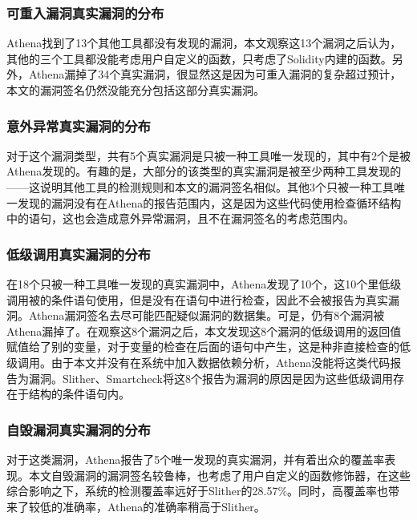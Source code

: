 \subsubsection{可重入漏洞真实漏洞的分布}

Athena找到了13个其他工具都没有发现的漏洞，本文观察这13个漏洞之后认为，其他的三个工具都没能考虑用户自定义的函数，只考虑了Solidity内建的函数。另外，Athena漏掉了34个真实漏洞，很显然这是因为可重入漏洞的复杂超过预计，本文的漏洞签名仍然没能充分包括这部分真实漏洞。

\subsubsection{意外异常真实漏洞的分布}

对于这个漏洞类型，共有5个真实漏洞是只被一种工具唯一发现的，其中有2个是被Athena发现的。有趣的是，大部分的该类型的真实漏洞是被至少两种工具发现的——这说明其他工具的检测规则和本文的漏洞签名相似。其他3个只被一种工具唯一发现的漏洞没有在Athena的报告范围内，这是因为这些代码使用检查循环结构中的语句，这也会造成意外异常漏洞，且不在漏洞签名的考虑范围内。

\subsubsection{低级调用真实漏洞的分布}

在18个只被一种工具唯一发现的真实漏洞中，Athena发现了10个，这10个里低级调用被的条件语句使用，但是没有在语句中进行检查，因此不会被报告为真实漏洞。Athena漏洞签名去尽可能匹配疑似漏洞的数据集。可是，仍有8个漏洞被Athena漏掉了。在观察这8个漏洞之后，本文发现这8个漏洞的低级调用的返回值赋值给了别的变量，对于变量的检查在后面的语句中产生，这是种非直接检查的低级调用。由于本文并没有在系统中加入数据依赖分析，Athena没能将这类代码报告为漏洞。Slither、Smartcheck将这8个报告为漏洞的原因是因为这些低级调用存在于结构的条件语句内。

\subsubsection{自毁漏洞真实漏洞的分布}

对于这类漏洞，Athena报告了5个唯一发现的真实漏洞，并有着出众的覆盖率表现。本文自毁漏洞的漏洞签名较鲁棒，也考虑了用户自定义的函数修饰器，在这些综合影响之下，系统的检测覆盖率远好于Slither的28.57\%。同时，高覆盖率也带来了较低的准确率，Athena的准确率稍高于Slither。

